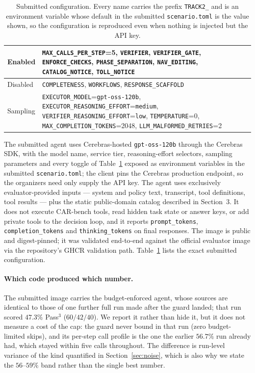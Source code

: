 \documentclass{article}
\begin{document}
\begin{table}[t]
\centering\small
\begin{tabular}{@{}l>{\raggedright\arraybackslash}p{56mm}@{}}
\toprule
Enabled & \texttt{MAX\_CALLS\_PER\_STEP}=5, \texttt{VERIFIER},
  \texttt{VERIFIER\_GATE}, \texttt{ENFORCE\_CHECKS},
  \texttt{PHASE\_SEPARATION}, \texttt{NAV\_EDITING},
  \texttt{CATALOG\_NOTICE}, \texttt{TOLL\_NOTICE}\\
\midrule
Disabled & \texttt{COMPLETENESS}, \texttt{WORKFLOWS},
  \texttt{RESPONSE\_SCAFFOLD}\\
\midrule
Sampling & \texttt{EXECUTOR\_MODEL}=\texttt{gpt-oss-120b},
  \texttt{EXECUTOR\_REASONING\_EFFORT}=\texttt{medium},
  \texttt{VERIFIER\_REASONING\_EFFORT}=\texttt{low},
  \texttt{TEMPERATURE}=0,
  \texttt{MAX\_COMPLETION\_TOKENS}=2048,
  \texttt{LLM\_MALFORMED\_RETRIES}=2\\
\bottomrule
\end{tabular}
\caption{Submitted configuration. Every name carries the prefix
\texttt{TRACK2\_} and is an environment variable whose default in the
submitted \texttt{scenario.toml} is the value shown, so the
configuration is reproduced even when nothing is injected but the API
key.}
\label{tab:config}
\end{table}

The submitted agent uses Cerebras-hosted \cite{cerebras2026}
\texttt{gpt-oss-120b} \cite{openai2025gptoss} through
the Cerebras SDK, with the model name, service tier, reasoning-effort
selectors, sampling parameters and every toggle of Table~\ref{tab:config}
exposed as environment variables in the submitted
\texttt{scenario.toml}; the client pins the Cerebras production
endpoint, so the organizers need only supply the API key. The agent uses exclusively
evaluator-provided inputs --- system and policy text, transcript, tool
definitions, tool results --- plus the static public-domain catalog
described in Section~3. It does not execute CAR-bench tools, read
hidden task state or answer keys, or add private tools to the decision
loop, and it reports \texttt{prompt\_tokens}, \texttt{completion\_tokens}
and \texttt{thinking\_tokens} on final responses. The image is public
and digest-pinned; it was validated end-to-end against the official
evaluator image via the repository's GHCR validation path.
Table~\ref{tab:config} lists the exact submitted configuration.

\paragraph{Which code produced which number.}
The submitted image carries the budget-enforced agent, whose sources
are identical to those of one further full run made after the guard
landed; that run scored $47.3\%$ Pass$^3$ ($60/42/40$). We report it
rather than hide it, but it does not measure a cost of the cap: the
guard never bound in that run (zero budget-limited skips), and its
per-step call profile is the one the earlier $56.7\%$ run already had,
which stayed within five calls throughout. The
difference is run-level variance of the kind quantified in
Section~\ref{sec:noise}, which is also why we state the $56$--$59\%$
band rather than the single best number.
\end{document}
